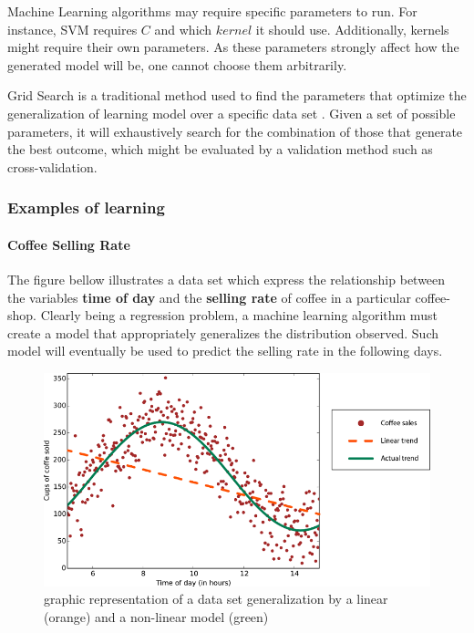 \documentclass[12pt]{article}
\begin{document}
Machine Learning algorithms may require specific parameters to run. For instance, SVM requires $C$ and which $kernel$ it should use. Additionally, kernels might require their own parameters. As these parameters strongly affect how the generated model will be, one cannot choose them arbitrarily.

Grid Search is a traditional method used to find the parameters that optimize the generalization of learning model over a specific data set \cite{gridsearch}. Given a set of possible parameters, it will exhaustively search for the combination of those that generate the best outcome, which might be evaluated by a validation method such as cross-validation.

\subsubsection{Examples of learning}

\paragraph{Coffee Selling Rate}

The figure bellow illustrates a data set which express the relationship between the variables \textbf{time of day} and the \textbf{selling rate} of coffee in a particular coffee-shop. Clearly being a regression problem, a machine learning algorithm must create a model that appropriately generalizes the distribution observed. Such model will eventually be used to predict the selling rate in the following days.

\begin{figure}[H]
	\centering
	\captionsetup{justification=centering}

	\includegraphics[scale=.6]{rohrer2015}
	\caption{graphic representation of a data set generalization by a linear (orange) and a non-linear model (green)}
	\label{fig:rohrer2015}
\end{figure}
\end{document}
